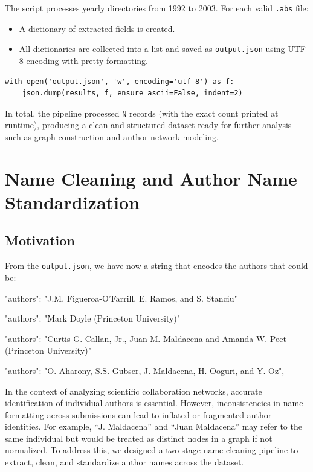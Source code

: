 \documentclass[12pt]{article}
\begin{document}
The script processes yearly directories from 1992 to 2003. For each valid \texttt{.abs} file:
\begin{itemize}
    \item A dictionary of extracted fields is created.
    \item All dictionaries are collected into a list and saved as \texttt{output.json} using UTF-8 encoding with pretty formatting.
\end{itemize}






\begin{verbatim}
with open('output.json', 'w', encoding='utf-8') as f:
    json.dump(results, f, ensure_ascii=False, indent=2)
\end{verbatim}

In total, the pipeline processed \texttt{N} records (with the exact count printed at runtime), producing a clean and structured dataset ready for further analysis such as graph construction and author network modeling.

\section{Name Cleaning and Author Name Standardization}

\subsection{Motivation}
From the \texttt{output.json}, we have now a string that encodes the authors that could be:
\begin{tcolorbox}
"authors": "J.M. Figueroa-O'Farrill, E. Ramos, and S. Stanciu"

"authors": "Mark Doyle (Princeton University)"

"authors": "Curtis G. Callan, Jr., Juan M. Maldacena and Amanda W. Peet (Princeton University)"

"authors": "O. Aharony, S.S. Gubser, J. Maldacena, H. Ooguri, and Y. Oz",
\end{tcolorbox}


In the context of analyzing scientific collaboration networks, accurate identification of individual authors is essential. However, inconsistencies in name formatting across submissions can lead to inflated or fragmented author identities. For example, ``J. Maldacena'' and ``Juan Maldacena'' may refer to the same individual but would be treated as distinct nodes in a graph if not normalized. To address this, we designed a two-stage name cleaning pipeline to extract, clean, and standardize author names across the dataset.
\end{document}
